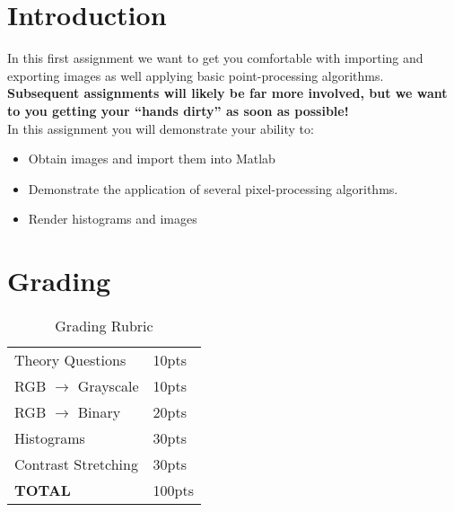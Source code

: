 \documentclass[12pt]{article}
\begin{document}
\maketitle


\section*{Introduction}
In this first assignment we want to get you comfortable with importing and exporting images as well applying basic point-processing algorithms.   \\

\noindent
\textbf{Subsequent assignments will likely be far more involved, but we want to you getting your “hands dirty” as soon as possible!}\\

\noindent
In this assignment you will demonstrate your ability to:
\begin{itemize}
\item Obtain images and import them into Matlab
\item Demonstrate the application of several pixel-processing algorithms.
\item Render histograms and images
\end{itemize}

\section*{Grading}
\begin{table}[h]
\begin{centering}
\begin{tabular}{|l|l|}
\hline
Theory Questions & 10pts \\
RGB $\rightarrow$ Grayscale & 10pts\\
RGB $\rightarrow$ Binary & 20pts\\
Histograms & 30pts\\
Contrast Stretching & 30pts\\
\hline
\textbf{TOTAL} & 100pts\\
\hline
\end{tabular}
\caption{Grading Rubric}
\end{centering}
\end{table}

\newpage
\end{document}
